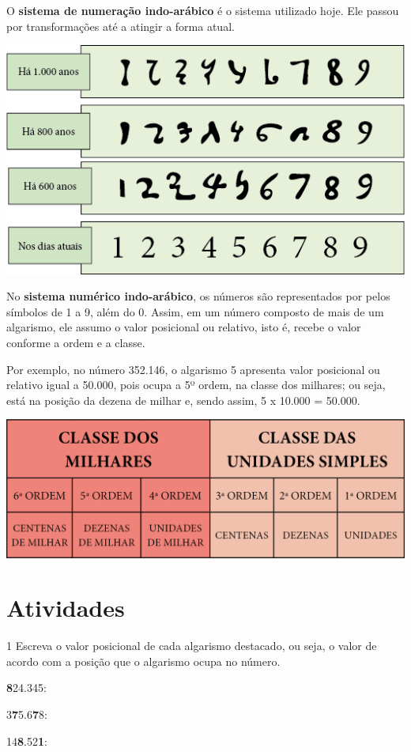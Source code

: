{O \textbf{sistema de numeração indo-arábico} é o sistema utilizado hoje. 
Ele passou por transformações até a atingir a forma atual.\bigskip

\includegraphics[width=.8\textwidth]{media/image5.png}\bigskip

No \textbf{sistema numérico indo-arábico}, os números são representados por 
pelos símbolos de 1 a 9, além do 0. Assim, em um número composto de mais
de um algarismo, ele assumo o valor posicional ou relativo, isto é, recebe 
o valor conforme a ordem e a classe. 

Por exemplo, no número 352.146, o algarismo 5 apresenta valor posicional ou
relativo igual a 50.000, pois ocupa a 5º ordem, na classe dos milhares; 
ou seja, está na posição da dezena de milhar e, sendo assim, 5 x 10.000 = 50.000.

\includegraphics[width=\textwidth]{media/image1.png}\bigskip
}

\section*{Atividades}

\num{1} Escreva o valor posicional de cada algarismo
destacado, ou seja, o valor de acordo com a posição
que o algarismo ocupa no número.

\begin{escolha}
\item \textbf{8}24.345: 

\item 3\textbf{7}5.6\textbf{7}8: 

\item 14\textbf{8}.52\textbf{1}:
\end{escolha}

